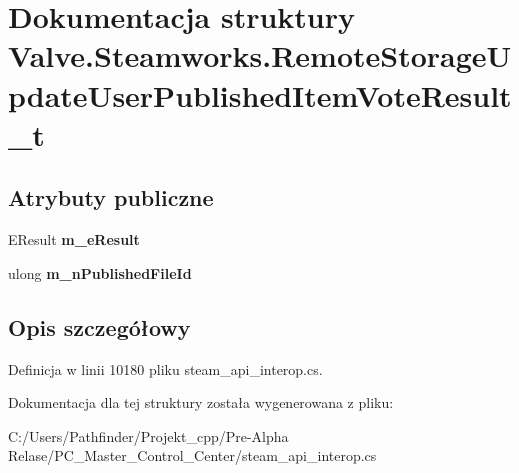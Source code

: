 \hypertarget{struct_valve_1_1_steamworks_1_1_remote_storage_update_user_published_item_vote_result__t}{}\section{Dokumentacja struktury Valve.\+Steamworks.\+Remote\+Storage\+Update\+User\+Published\+Item\+Vote\+Result\+\_\+t}
\label{struct_valve_1_1_steamworks_1_1_remote_storage_update_user_published_item_vote_result__t}
\subsection*{Atrybuty publiczne}
\begin{DoxyCompactItemize}
\item 
\mbox{\label{struct_valve_1_1_steamworks_1_1_remote_storage_update_user_published_item_vote_result__t_aedf491f28818d744865255871bf73719}} 
E\+Result {\bfseries m\+\_\+e\+Result}
\item 
\mbox{\label{struct_valve_1_1_steamworks_1_1_remote_storage_update_user_published_item_vote_result__t_afb3162f048b770f90bece258937634bf}} 
ulong {\bfseries m\+\_\+n\+Published\+File\+Id}
\end{DoxyCompactItemize}


\subsection{Opis szczegółowy}


Definicja w linii 10180 pliku steam\+\_\+api\+\_\+interop.\+cs.



Dokumentacja dla tej struktury została wygenerowana z pliku\+:\begin{DoxyCompactItemize}
\item 
C\+:/\+Users/\+Pathfinder/\+Projekt\+\_\+cpp/\+Pre-\/\+Alpha Relase/\+P\+C\+\_\+\+Master\+\_\+\+Control\+\_\+\+Center/steam\+\_\+api\+\_\+interop.\+cs\end{DoxyCompactItemize}
